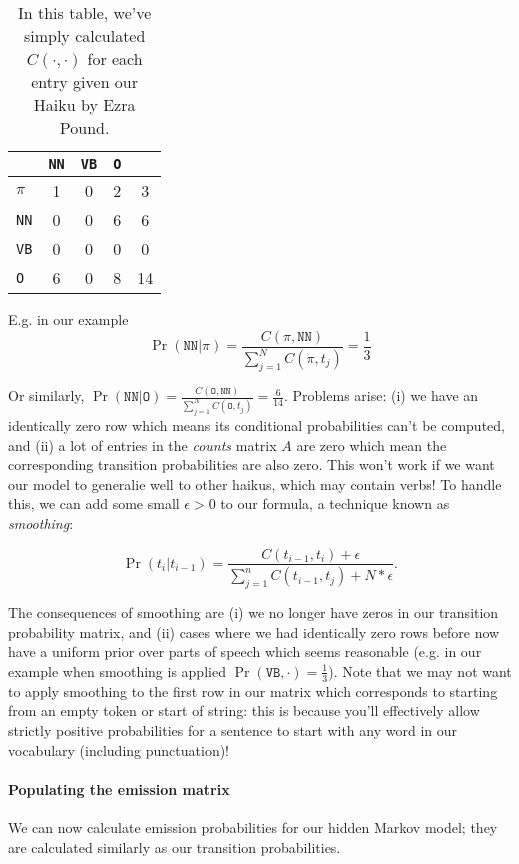 \documentclass[12pt]{article}
\begin{document}
\begin{table}[h]
  \begin{center}
    \begin{tabular}{|l | c | c | c | c |}
      \hline
      & \texttt{NN} & \texttt{VB} & \texttt{O} & \\
      \hline
      $\pi$ & 1 & 0 & 2 & 3 \\
      \hline
      \texttt{NN} & 0 & 0 & 6 & 6 \\
      \hline
      \texttt{VB} & 0 & 0 & 0 & 0 \\
      \hline
      \texttt{O}  & 6 & 0 & 8 & 14 \\
      \hline
    \end{tabular}
    \caption{In this table, we've simply calculated $C(\cdot, \cdot)$ for each entry given our Haiku by Ezra Pound.}
  \end{center}
\end{table}

E.g. in our example
\[
\Pr(\texttt{NN} | \pi) = \frac{C(\pi, \texttt{NN})}{\sum_{j=1}^N C(\pi, t_j)} = \frac{1}{3}
\]

Or similarly, $\Pr(\texttt{NN} | \texttt{O}) = \frac{C(\texttt{O}, \texttt{NN})}{\sum_{j=1}^N C(\texttt{O}, t_j)} = \frac{6}{14}$. Problems arise: (i) we have an identically zero row which means its conditional probabilities can't be computed, and (ii) a lot of entries in the \emph{counts} matrix $A$ are zero which mean the corresponding transition probabilities are also zero. This won't work if we want our model to generalie well to other haikus, which may contain verbs! To handle this, we can add some small $\epsilon > 0$ to our formula, a technique known as \emph{smoothing}:

\[
  \Pr(t_i | t_{i-1}) = \frac{C(t_{i-1}, t_i) + \epsilon }{\sum_{j=1}^{n} C(t_{i-1}, t_j) + N*\epsilon}.
\]

The consequences of smoothing are (i) we no longer have zeros in our transition probability matrix, and (ii) cases where we had identically zero rows before now have a uniform prior over parts of speech which seems reasonable (e.g. in our example when smoothing is applied $\Pr(\texttt{VB}, \cdot) = \frac{1}{3}$). Note that we may not want to apply smoothing to the first row in our matrix which corresponds to starting from an empty token or start of string: this is because you'll effectively allow strictly positive probabilities for a sentence to start with any word in our vocabulary (including punctuation)!

\paragraph{Populating the emission matrix}  We can now calculate emission probabilities for our hidden Markov model; they are calculated similarly as our transition probabilities.
\end{document}
